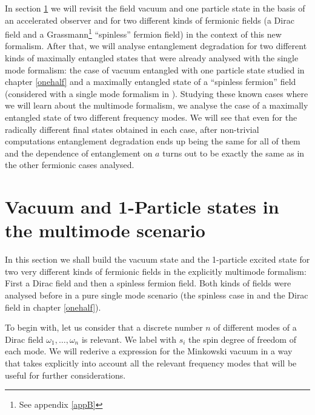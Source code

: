 In section \ref{s2} we will revisit the field vacuum and one particle state in the basis of an accelerated observer and for two different kinds of fermionic fields (a Dirac field and a Grassmann\footnote{See appendix \ref{appB}} ``spinless'' fermion field) in the context of this new formalism. After that, we will analyse entanglement degradation for two different kinds of maximally entangled states that were already analysed with the single mode formalism: the case of vacuum entangled with one particle state studied in chapter \ref{onehalf} and a maximally entangled state of a ``spinless fermion'' field (considered with a single mode formalism in \cite{AlsingSchul}). Studying these known cases where we will learn about the multimode formalism, we    analyse the case of a maximally entangled state of two different frequency modes. We will see that even for the radically different final states obtained in each case, after non-trivial computations entanglement degradation ends up being the same for all of them and the dependence of entanglement on $a$ turns out to be exactly the same as in the other fermionic cases analysed.

\section{Vacuum and 1-Particle states in the multimode scenario}\label{s2}

In this section we shall build the vacuum state and the 1-particle excited state for two very different kinds of fermionic fields in the explicitly multimode formalism: First a Dirac field and then a spinless fermion field. Both kinds of fields were analysed before in a pure single mode scenario (the spinless case in \cite{AlsingSchul} and the Dirac field in chapter \ref{onehalf}).

To begin with, let us consider that a discrete number $n$ of different modes of a Dirac field $\omega_1,\dots,\omega_n$ is relevant.  We label with $s_i$ the spin degree of freedom of each mode. We will rederive a expression for the Minkowski vacuum in a way that takes explicitly into account all the relevant frequency modes that will be useful for further considerations. 

